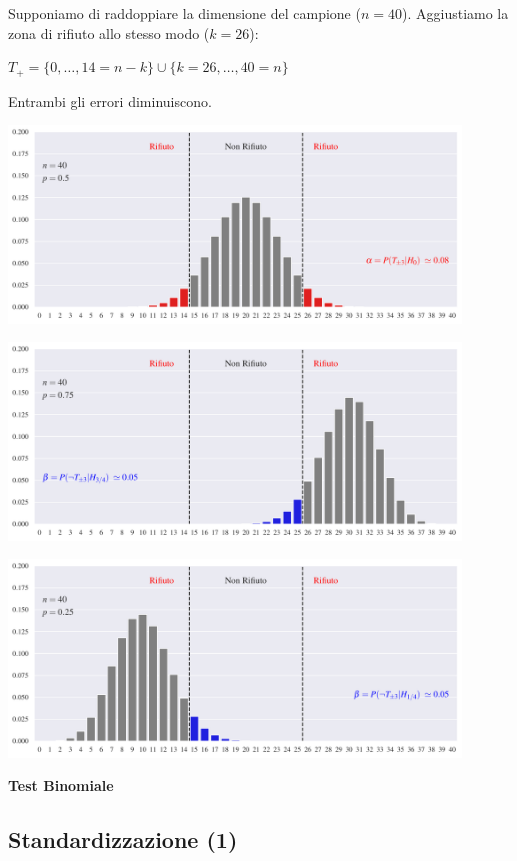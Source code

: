 \documentclass[11pt,openany]{book}
\begin{document}
Supponiamo di raddoppiare la dimensione del campione ($n=40$). Aggiustiamo la zona di rifiuto allo stesso modo ($k=26$): 

\hfil$T_+=\{0,\dots,14=n-k\}\cup \{k=26,\dots,40=n\}$

Entrambi gli errori diminuiscono.


\hfil\includegraphics[width=0.9\textwidth]{figure/B-test_07.pdf}

\hfil\includegraphics[width=0.9\textwidth]{figure/B-test_08.pdf}

\hfil\includegraphics[width=0.9\textwidth]{figure/B-test_09.pdf}




\hfill{}\clearpage\hfill\textbf{Test Binomiale}
\subsection{Standardizzazione (1)}
\end{document}
